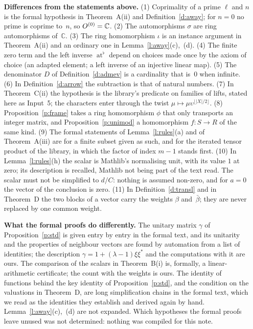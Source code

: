 \documentclass[11pt,a4paper]{article}
\newcommand{\m}[1]{\mbox{$#1$}}        %
\newcommand{\subhead}[1]{\par\addvspace{9pt plus 2pt}\Needspace{4\baselineskip}\noindent\textbf{#1}\enspace\ignorespaces}
\theoremstyle{plainx}
\theoremstyle{uprightx}
\newcommand{\CC}{\mathbb{C}}
\newcommand{\atl}{\operatorname{at}^{\flat}}
\begin{document}
\subhead{Differences from the statements above.} (1) Coprimality of a prime $\ell$ and $n$ is the formal
hypothesis in Theorem~A(ii) and Definition~\ref{d:away}; for \m{n=0} no prime is coprime to~$n$, so
\m{\intaw{0}=\CC}. (2) The automorphisms $\sigma$ are ring automorphisms of~$\CC$. (3) The ring homomorphism $\iota$
is an instance argument in Theorem~A(ii) and an ordinary one in Lemma~\ref{l:away}(c),~(d). (4) The finite zero term
and the left inverse $\atl$ depend on choices made once by the axiom of choice (an adapted element; a left
inverse of an injective linear map). (5) The denominator $D$ of Definition~\ref{d:admev} is a cardinality that
is~$0$ when infinite. (6) In Definition~\ref{d:arrow} the subtraction is that of natural numbers. (7) In
Theorem~C(ii) the hypothesis is the library's predicate on families of lifts, stated here as Input~5; the
characters enter through the twist \m{\mu\mapsto\mu\upsilon^{\lfloor|X|/2\rfloor}}. (8) Proposition~\ref{p:frame} takes
a ring homomorphism $\phi$ that only transports an integer matrix, and Proposition~\ref{p:unimod} a homomorphism
\m{f\colon S\to R} of the same kind. (9) The formal statements of Lemma~\ref{l:rules}(a) and of Theorem~A(iii)
are for a finite subset given as such, and for the iterated tensor product of the library, in which the factor
of index $m-1$ stands first. (10) In Lemma~\ref{l:rules}(h) the scalar is Mathlib's normalising unit, with its
value $1$ at zero; its description is recalled, Mathlib not being part of the text read. The scalar must not be
simplified to \m{d/C}: nothing is assumed non-zero, and for \m{a=0} the vector of the conclusion is zero. (11) In
Definition~\ref{d:transl} and in Theorem~D the two blocks of a vector carry the weights $\beta$ and~$\bar\beta$;
they are never replaced by one common weight.

\subhead{What the formal proofs do differently.} The unitary matrix $\gamma$ of Proposition~\ref{p:std} is given
entry by entry in the formal text, and its unitarity and the properties of neighbour vectors are found by
automation from a list of identities; the description \m{\gamma=1+(\lambda-1)\xi\xi^{*}} and the computations with
it are ours. The comparison of the scalars in Theorem~B(i) is, formally, a linear-arithmetic certificate; the
count with the weights is ours. The identity of functions behind the key identity of Proposition~\ref{p:std},
and the condition on the valuations in Theorem~D, are long simplification chains in the formal text, which we
read as the identities they establish and derived again by hand. Lemma~\ref{l:away}(c),~(d) are not expanded.
Which hypotheses the formal proofs leave unused was not determined: nothing was compiled for this note.
\end{document}
